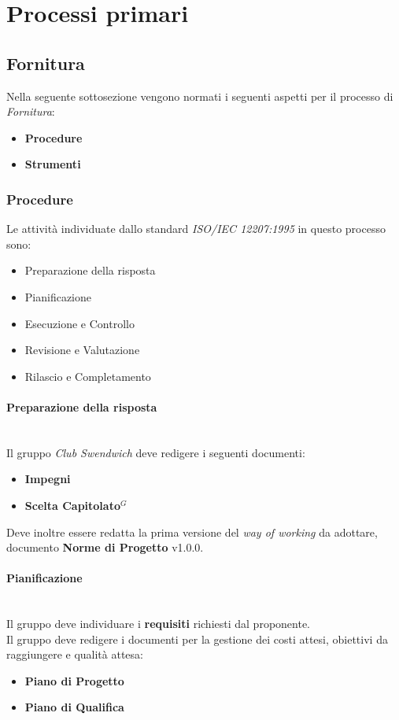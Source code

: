 \section{Processi primari}

\subsection{Fornitura}
Nella seguente sottosezione vengono normati i seguenti aspetti per il
processo di \textit{Fornitura}:
\begin{itemize}
    \item \textbf{Procedure}
    \item \textbf{Strumenti}
\end{itemize}

\subsubsection{Procedure}

Le attività individuate dallo standard \textit{ISO/IEC 12207:1995} in questo processo sono:
\begin{itemize}
    \item Preparazione della risposta
    \item Pianificazione
    \item Esecuzione e Controllo
    \item Revisione e Valutazione
    \item Rilascio e Completamento
\end{itemize}

\paragraph{Preparazione della risposta}
\mbox{} \\
Il gruppo \textit{Club Swendwich} deve redigere i seguenti documenti:
\begin{itemize}
    \item \textbf{Impegni}
    \item \textbf{Scelta Capitolato$^G$}
\end{itemize}
Deve inoltre essere redatta la prima versione del \textit{way of working} da adottare, documento \textbf{Norme di Progetto} v1.0.0.

\paragraph{Pianificazione}
\mbox{} \\
Il gruppo deve individuare i \textbf{requisiti} richiesti dal proponente.\\
Il gruppo deve redigere i documenti per la gestione dei costi attesi, obiettivi da raggiungere e qualità attesa:
\begin{itemize}
    \item \textbf{Piano di Progetto}
    \item \textbf{Piano di Qualifica}
\end{itemize}

